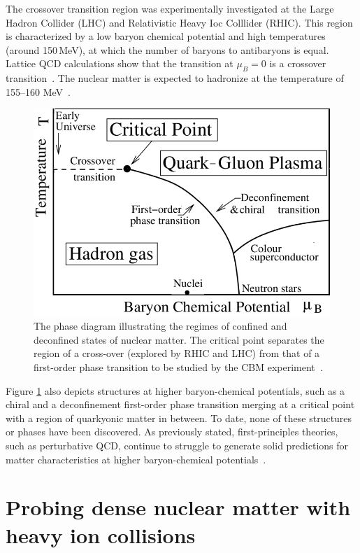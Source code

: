 The crossover transition region was experimentally investigated at the Large Hadron Collider (\gls{LHC}) and Relativistic Heavy Ioc Colllider (\gls{RHIC}). This region is characterized by a low baryon chemical potential and high temperatures (around 150\,MeV), at which the number of baryons to antibaryons is equal. Lattice \gls{QCD} calculations show that the transition at $\mu_{B} = 0$ is a crossover transition~\cite{Aoki_2006}. The nuclear matter is expected to hadronize at the temperature of 155--160 MeV~\cite{Bazavov_2012, Stachel_2014}.



\begin{figure}[!h]
\centering
 \includegraphics[width=0.65\columnwidth]{Chapter1/images/phase.png}
\caption{The phase diagram illustrating the regimes of confined and deconfined states of nuclear matter. The critical point separates the region of a cross-over (explored by \gls{RHIC} and \gls{LHC}) from that of a first-order phase transition to be studied by the CBM experiment~\cite{friese_diagram}.}
\label{fig_phase}
\end{figure}
\newpage
Figure \ref{fig_phase} also depicts structures at higher baryon-chemical potentials, such as a chiral and a deconfinement first-order phase transition merging at a critical point with a region of quarkyonic matter in between. To date, none of these structures or phases have been discovered. As previously stated, first-principles theories, such as perturbative QCD, continue to struggle to generate solid predictions for matter characteristics at higher baryon-chemical potentials~\cite{Sakai_2008, Fischer_01, Tawfik_01}. 



\section{Probing dense nuclear matter with heavy ion collisions}

